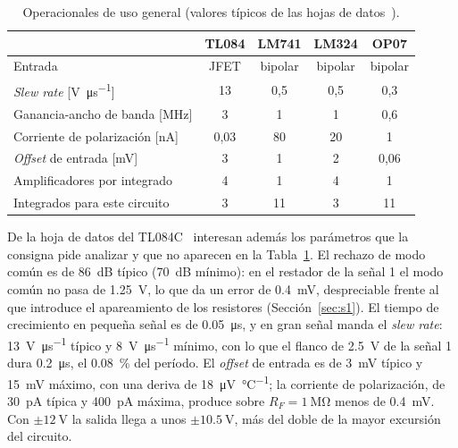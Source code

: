 \begin{table}[!htb]
\centering
\caption{Operacionales de uso general (valores típicos de las hojas de datos~\cite{tl08x, opamps}).}
\label{tab:opamps}
\footnotesize
\setlength{\tabcolsep}{3.5pt}
\begin{tabular}{@{}lcccc@{}}
\toprule
 & \textbf{TL084} & \textbf{LM741} & \textbf{LM324} & \textbf{OP07} \\
\midrule
Entrada & JFET & bipolar & bipolar & bipolar \\
\emph{Slew rate} [\si{\volt\per\micro\second}] & 13 & 0,5 & 0,5 & 0,3 \\
Ganancia-ancho de banda [\si{\mega\hertz}] & 3 & 1 & 1 & 0,6 \\
Corriente de polarización [\si{\nano\ampere}] & 0,03 & 80 & 20 & 1 \\
\emph{Offset} de entrada [\si{\milli\volt}] & 3 & 1 & 2 & 0,06 \\
Amplificadores por integrado & 4 & 1 & 4 & 1 \\
Integrados para este circuito & 3 & 11 & 3 & 11 \\
\bottomrule
\end{tabular}
\end{table}

De la hoja de datos del TL084C~\cite{tl08x} interesan además los parámetros que la consigna pide analizar y que no aparecen en la Tabla~\ref{tab:opamps}. El rechazo de modo común es de \SI{86}{\deci\bel} típico (\SI{70}{\deci\bel} mínimo): en el restador de la señal 1 el modo común no pasa de \SI{1,25}{\volt}, lo que da un error de \SI{0,4}{\milli\volt}, despreciable frente al que introduce el apareamiento de los resistores (Sección~\ref{sec:s1}). El tiempo de crecimiento en pequeña señal es de \SI{0,05}{\micro\second}, y en gran señal manda el \emph{slew rate}: \SI{13}{\volt\per\micro\second} típico y \SI{8}{\volt\per\micro\second} mínimo, con lo que el flanco de \SI{2,5}{\volt} de la señal 1 dura \SI{0,2}{\micro\second}, el \SI{0,08}{\percent} del período. El \emph{offset} de entrada es de \SI{3}{\milli\volt} típico y \SI{15}{\milli\volt} máximo, con una deriva de \SI{18}{\micro\volt\per\celsius}; la corriente de polarización, de \SI{30}{\pico\ampere} típica y \SI{400}{\pico\ampere} máxima, produce sobre $R_F = \SI{1}{\mega\ohm}$ menos de \SI{0,4}{\milli\volt}. Con $\pm\SI{12}{\volt}$ la salida llega a unos $\pm\SI{10,5}{\volt}$, más del doble de la mayor excursión del circuito.

